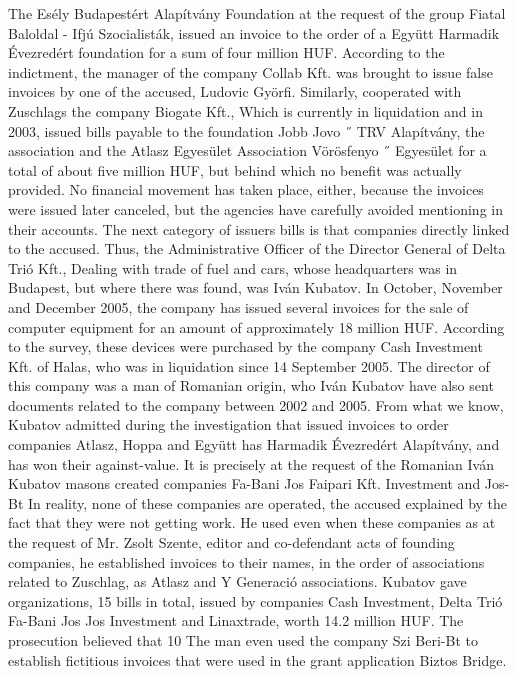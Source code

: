 The Esély Budapestért Alapítvány Foundation at the request of the group Fiatal Baloldal - Ifjú Szocialisták, issued an invoice to the order of a Együtt Harmadik Évezredért foundation for a sum of four million HUF.
According to the indictment, the manager of the company Collab Kft. was brought to issue false invoices by one of the accused, Ludovic Györfi.
Similarly, cooperated with Zuschlags the company Biogate Kft., Which is currently in liquidation and in 2003, issued bills payable to the foundation Jobb Jovo ˝ TRV Alapítvány, the association and the Atlasz Egyesület Association Vörösfenyo ˝ Egyesület for a total of about five million HUF, but behind which no benefit was actually provided.
No financial movement has taken place, either, because the invoices were issued later canceled, but the agencies have carefully avoided mentioning in their accounts.
The next category of issuers bills is that companies directly linked to the accused.
Thus, the Administrative Officer of the Director General of Delta Trió Kft., Dealing with trade of fuel and cars, whose headquarters was in Budapest, but where there was found, was Iván Kubatov.
In October, November and December 2005, the company has issued several invoices for the sale of computer equipment for an amount of approximately 18 million HUF.
According to the survey, these devices were purchased by the company Cash Investment Kft. of Halas, who was in liquidation since 14 September 2005.
The director of this company was a man of Romanian origin, who Iván Kubatov have also sent documents related to the company between 2002 and 2005.
From what we know, Kubatov admitted during the investigation that issued invoices to order companies Atlasz, Hoppa and Együtt has Harmadik Évezredért Alapítvány, and has won their against-value.
It is precisely at the request of the Romanian Iván Kubatov masons created companies Fa-Bani Jos Faipari Kft. Investment and Jos-Bt
In reality, none of these companies are operated, the accused explained by the fact that they were not getting work.
He used even when these companies as at the request of Mr. Zsolt Szente, editor and co-defendant acts of founding companies, he established invoices to their names, in the order of associations related to Zuschlag, as Atlasz and Y Generació associations.
Kubatov gave organizations, 15 bills in total, issued by companies Cash Investment, Delta Trió Fa-Bani Jos Jos Investment and Linaxtrade, worth 14.2 million HUF.
The prosecution believed that 10%
The man even used the company Szi Beri-Bt to establish fictitious invoices that were used in the grant application Biztos Bridge.
